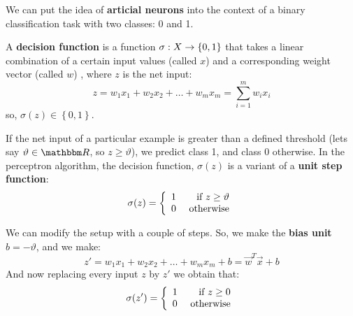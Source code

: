 \documentclass[../machine_learning_scikit.tex]{subfiles}
\begin{document}
    We can put the idea of \textbf{articial neurons} into the context of a binary classification task with two classes: 0 and 1.

    \begin{mydef}
        A \textbf{decision function} is a function $\sigma:X\rightarrow\left\{0,1\right\}$ that takes a linear combination of a certain input values (called $x$) and a corresponding weight vector (called $w$) , where $z$ is the net input:
        \begin{equation*}
            z=w_1x_1+w_2x_2+\dots+w_mx_m=\sum_{ i=1}^m w_ix_i
        \end{equation*}
        so, $\sigma(z)\in\left\{0,1\right\}$.
    \end{mydef}

    If the net input of a particular example is greater than a defined threshold (lets say $\vartheta\in\bbm{R}$, so $z\geq\vartheta$), we predict class 1, and class 0 otherwise. In the perceptron algorithm, the decision function, $\sigma(z)$ is a variant of a \textbf{unit step function}:
    \begin{equation*}
        \sigma(z)=\left\{
            \begin{array}{lr}
                1 & \textup{ if }z\geq\vartheta\\
                0 & \textup{ otherwise} \\
            \end{array}
        \right.
    \end{equation*}

    \begin{obs}
        We can modify the setup with a couple of steps. So, we make the \textbf{bias unit} $b=-\vartheta$, and we make:
        \begin{equation*}
            z'=w_1x_1+w_2x_2+\dots+w_mx_m+b=\vec{w}^T\vec{x}+b
        \end{equation*}
        And now replacing every input $z$ by $z'$ we obtain that:
        \begin{equation*}
            \sigma(z')=\left\{
                \begin{array}{lr}
                    1 & \textup{ if }z\geq0\\
                    0 & \textup{ otherwise} \\
                \end{array}
            \right.
        \end{equation*}
    \end{obs}
\end{document}
